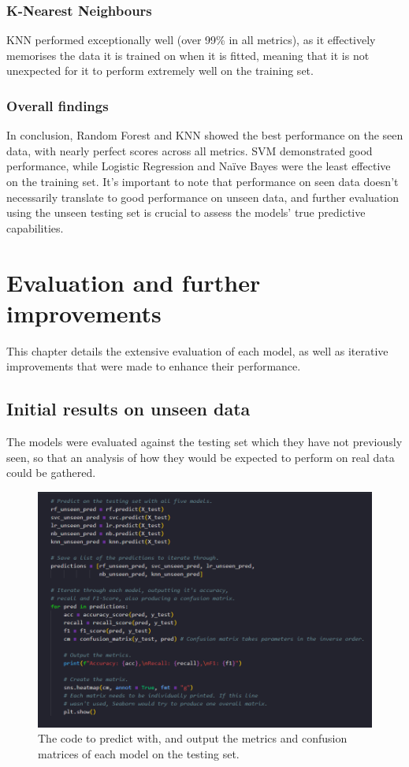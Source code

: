 \documentclass[12pt]{report}
\begin{document}
\subsection{K-Nearest Neighbours}
KNN performed exceptionally well (over 99\% in all metrics), as it effectively memorises the data it is trained on when it is fitted,
meaning that it is not unexpected for it to perform extremely well on the training set.

\subsection{Overall findings}
In conclusion, Random Forest and KNN showed the best performance on the seen data, with nearly perfect scores across all metrics. 
SVM demonstrated good performance, while Logistic Regression and Naïve Bayes were the least effective on the training set. 
It's important to note that performance on seen data doesn't necessarily translate to good performance on unseen data, and further
evaluation using the unseen testing set is crucial to assess the models' true predictive capabilities.


\chapter{Evaluation and further improvements}
This chapter details the extensive evaluation of each model, as well as iterative improvements 
that were made to enhance their performance.

\section{Initial results on unseen data}
The models were evaluated against the testing set which they have not previously seen, so that an analysis 
of how they would be expected to perform on real data could be gathered.

\begin{figure}[H]
    \centering
    \includegraphics[width=\linewidth]{ModelDev/Iteration1/Code/Unseen/Matrices.png}
    \caption{The code to predict with, and output the metrics and confusion matrices of each model on the testing set.}
    \label{fig:UnseenDataCode}
\end{figure}
\end{document}
